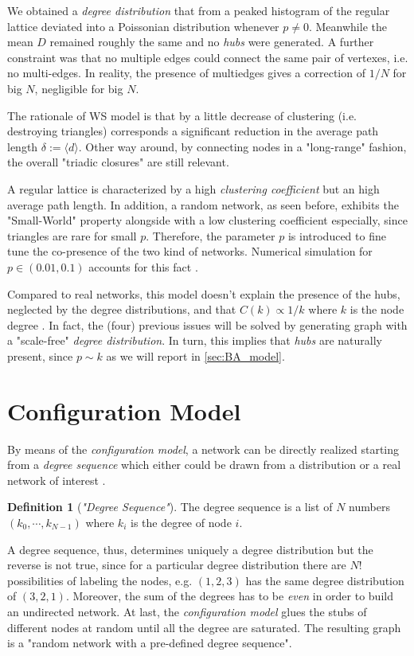 \documentclass[a4paper,10pt, oneside]{book} %
\theoremstyle{definition}
\newtheorem{definition}{Definition}[section]
\begin{document}
We obtained a \textit{degree distribution} that from a peaked histogram of the regular lattice deviated into a Poissonian distribution whenever $ p \neq 0$. Meanwhile the mean $ D$ remained roughly the same and no \textit{hubs} were generated.
A further constraint was that no multiple edges could connect the same pair of vertexes, i.e. no multi-edges. In reality, the presence of multiedges gives a correction of $1/N$ for big $N$, negligible for big $N$.

The rationale of WS model is that by a little decrease of clustering (i.e. destroying triangles) corresponds a significant reduction in the average path length $\delta:= \langle d \rangle$. Other way around, by connecting nodes in a "long-range" fashion, the overall "triadic closures" are still relevant. 

A regular lattice is characterized by a high \textit{clustering coefficient} but an high average path length. In addition, a random network, as seen before, exhibits the "Small-World" property alongside with a low clustering coefficient especially, since triangles are rare for small $p$.
Therefore, the parameter $p$ is introduced to fine tune the co-presence of the two kind of networks. Numerical simulation for $p \in (0.01,0.1)$ accounts for this fact \cite{Menczer:2020_1stCoursNetSci}.

Compared to real networks, this model doesn't explain the presence of the hubs, neglected by the degree distributions, and that $C(k) \propto 1/k$ where $ k$ is the node degree \cite{barabasi::2016networkbook}. In fact, the (four) previous issues will be solved by generating graph with a "scale-free" \textit{degree distribution}. In turn, this implies that \textit{hubs} are naturally present, since $ p \sim k$ as we will report in \autoref{sec:BA_model}.

\section{Configuration Model}
By means of the \textit{configuration model}, a network can be directly realized starting from a \textit{degree sequence} which either could be drawn from a distribution or a real network of interest \cite{Menczer:2020_1stCoursNetSci}.

\begin{definition}[\textit{"Degree Sequence"}]
	The degree sequence is a list of $N$ numbers $(k_0, \cdots, k_{N-1})$ where $k_i$ is the degree of node $i$.
\end{definition}
A degree sequence, thus, determines uniquely a degree distribution but the reverse is not true, since for a particular degree distribution there are $N!$ possibilities of labeling the nodes, e.g. $(1,2,3)$ has the same degree distribution of $(3,2,1)$. Moreover, the sum of the degrees has to be \textit{even} in order to build an undirected network. 
At last, the \textit{configuration model} glues the stubs of different nodes at random until all the degree are saturated. The resulting graph is a "random network with a pre-defined degree sequence". 
\end{document}
